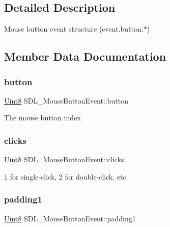 \subsection{Detailed Description}
Mouse button event structure (event.\+button.$\ast$) 

\subsection{Member Data Documentation}
\mbox{\label{struct_s_d_l___mouse_button_event_a1a4680e19ae06d02d2093f0bcba1b24c}} 
\subsubsection{\texorpdfstring{button}{button}}
{\footnotesize\ttfamily \mbox{\hyperlink{_s_d_l__stdinc_8h_a2944638813a090aa23e62f4da842c3e2}{Uint8}} S\+D\+L\+\_\+\+Mouse\+Button\+Event\+::button}

The mouse button index \mbox{\label{struct_s_d_l___mouse_button_event_aa606bebcbc3ffc7e932016039c2a36a1}} 
\subsubsection{\texorpdfstring{clicks}{clicks}}
{\footnotesize\ttfamily \mbox{\hyperlink{_s_d_l__stdinc_8h_a2944638813a090aa23e62f4da842c3e2}{Uint8}} S\+D\+L\+\_\+\+Mouse\+Button\+Event\+::clicks}

1 for single-\/click, 2 for double-\/click, etc. \mbox{\label{struct_s_d_l___mouse_button_event_a765957d218d16fa00558fa4d20e80689}} 
\subsubsection{\texorpdfstring{padding1}{padding1}}
{\footnotesize\ttfamily \mbox{\hyperlink{_s_d_l__stdinc_8h_a2944638813a090aa23e62f4da842c3e2}{Uint8}} S\+D\+L\+\_\+\+Mouse\+Button\+Event\+::padding1}

